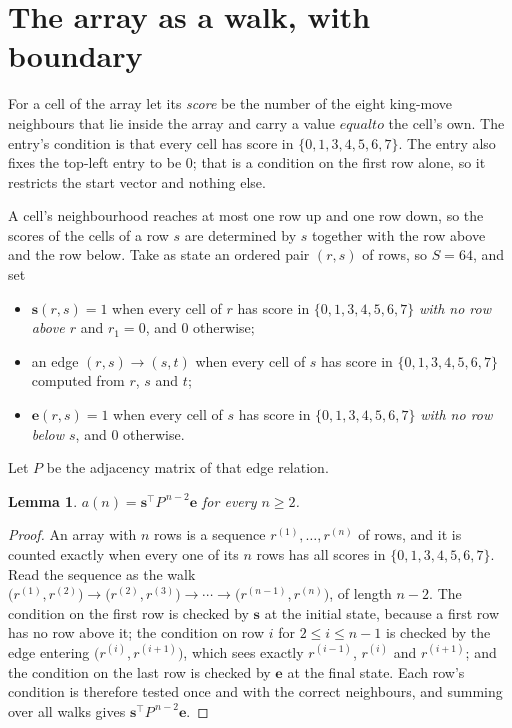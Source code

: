 \documentclass[11pt,a4paper]{article}
\theoremstyle{plain}
\newtheorem{lemma}[theorem]{Lemma}
\theoremstyle{definition}
\begin{document}
\section{The array as a walk, with boundary}

For a cell of the array let its \emph{score} be the number of the eight king-move neighbours that lie inside
the array and carry a value $equal to$ the cell's own. The entry's condition is that every cell
has score in $\{0,1,3,4,5,6,7\}$. The entry also fixes the top-left entry to be $0$; that is a condition on the first row alone, so it restricts the start vector and nothing else.

A cell's neighbourhood reaches at most one row up and one row down, so the scores of the
cells of a row $s$ are determined by $s$ together with the row above and the row below.
Take as state an ordered pair $(r,s)$ of rows, so $S=64$, and set
\begin{itemize}
\item $\mathbf{s}(r,s)=1$ when every cell of $r$ has score in $\{0,1,3,4,5,6,7\}$ \emph{with no row
above $r$} and $r_1=0$, and $0$ otherwise;
\item an edge $(r,s)\to(s,t)$ when every cell of $s$ has score in $\{0,1,3,4,5,6,7\}$ computed from
$r$, $s$ and $t$;
\item $\mathbf{e}(r,s)=1$ when every cell of $s$ has score in $\{0,1,3,4,5,6,7\}$ \emph{with no row
below $s$}, and $0$ otherwise.
\end{itemize}
Let $P$ be the adjacency matrix of that edge relation.

\begin{lemma}\label{lem:walk}
$a(n)=\mathbf{s}^{\!\top}P^{\,n-2}\mathbf{e}$ for every $n\ge2$.
\end{lemma}

\begin{proof}
An array with $n$ rows is a sequence $r^{(1)},\dots,r^{(n)}$ of rows, and it is counted
exactly when every one of its $n$ rows has all scores in $\{0,1,3,4,5,6,7\}$. Read the sequence as the
walk $\bigl(r^{(1)},r^{(2)}\bigr)\to\bigl(r^{(2)},r^{(3)}\bigr)\to\cdots\to
\bigl(r^{(n-1)},r^{(n)}\bigr)$, of length $n-2$. The condition on the first row is
checked by $\mathbf{s}$ at the initial state, because a first row has no row above it; the
condition on row $i$ for $2\le i\le n-1$ is checked by the edge entering
$\bigl(r^{(i)},r^{(i+1)}\bigr)$, which sees exactly $r^{(i-1)}$, $r^{(i)}$ and
$r^{(i+1)}$; and the condition on the last row is checked by $\mathbf{e}$ at the final
state. Each row's condition is therefore tested once and with the correct neighbours, and
summing over all walks gives $\mathbf{s}^{\!\top}P^{\,n-2}\mathbf{e}$.
\end{proof}
\end{document}
